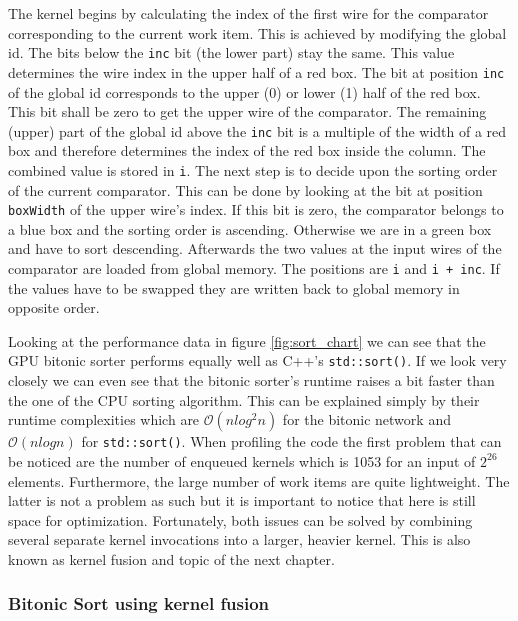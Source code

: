 \pagebreak

The kernel begins by calculating the index of the first wire for the comparator corresponding to the current work item. This is achieved by modifying the global id. The bits below the \lstinline!inc! bit (the lower part) stay the same. This value determines the wire index in the upper half of a red box. The bit at position \lstinline!inc! of the global id corresponds to the upper (0) or lower (1) half of the red box. This bit shall be zero to get the upper wire of the comparator. The remaining (upper) part of the global id above the \lstinline!inc! bit is a multiple of the width of a red box and therefore determines the index of the red box inside the column. The combined value is stored in \lstinline!i!.
The next step is to decide upon the sorting order of the current comparator. This can be done by looking at the bit at position \lstinline!boxWidth! of the upper wire's index. If this bit is zero, the comparator belongs to a blue box and the sorting order is ascending. Otherwise we are in a green box and have to sort descending.
Afterwards the two values at the input wires of the comparator are loaded from global memory. The positions are \lstinline!i! and \lstinline!i + inc!. If the values have to be swapped they are written back to global memory in opposite order.

Looking at the performance data in figure \ref{fig:sort_chart} we can see that the GPU bitonic sorter performs equally well as C++'s \lstinline!std::sort()!. If we look very closely we can even see that the bitonic sorter's runtime raises a bit faster than the one of the CPU sorting algorithm. This can be explained simply by their runtime complexities which are $\mathcal{O}(n log^2 n)$ for the bitonic network and $\mathcal{O}(n log n)$ for \lstinline!std::sort()!.
When profiling the code the first problem that can be noticed are the number of enqueued kernels which is 1053 for an input of $2^{26}$ elements. Furthermore, the large number of work items are quite lightweight. The latter is not a problem as such but it is important to notice that here is still space for optimization. Fortunately, both issues can be solved by combining several separate kernel invocations into a larger, heavier kernel. This is also known as kernel fusion and topic of the next chapter.


\subsubsection{Bitonic Sort using kernel fusion}

